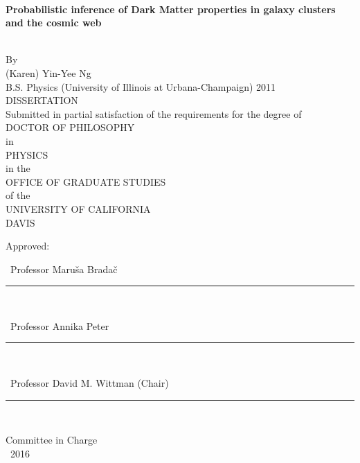 \singlespacing

~\vspace{-0.75in} %
\begin{center}

  \begin{large}
    {\bf Probabilistic inference of Dark Matter properties in galaxy clusters
		and the cosmic web}
  \end{large}\\\n
  By\\\n
  {\sc (Karen) Yin-Yee Ng}\\
  B.S. Physics (University of Illinois at Urbana-Champaign) 2011\\
  DISSERTATION\\\n
  Submitted in partial satisfaction of the requirements for the degree of\\\n
  DOCTOR OF PHILOSOPHY\\\n
  in\\\n
  PHYSICS\\\n
  in the\\\n
  OFFICE OF GRADUATE STUDIES\\\n
  of the\\\n
  UNIVERSITY OF CALIFORNIA\\\n
  DAVIS\\\n\n
  
  Approved:\\\n\n
  
  ~Professor Maru{\v s}a Brada{\v c}\\
  \rule{4in}{1pt}\\\n\n  

  ~Professor Annika Peter\\
  \rule{4in}{1pt}\\\n\n  

  ~Professor David M. Wittman (Chair)\\
  \rule{4in}{1pt}\\

  \vfill
  
  Committee in Charge\\
  ~2016
  
\end{center}

